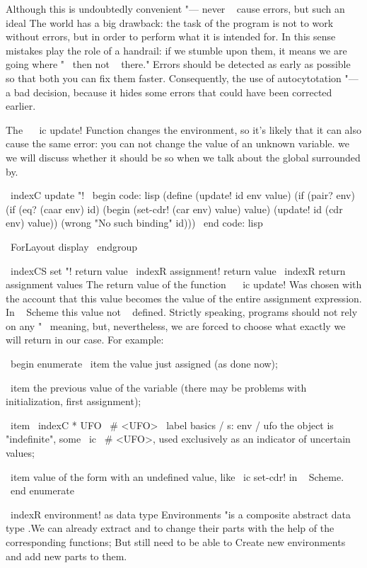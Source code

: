 {Although this is undoubtedly convenient "--- never ~ cause errors, but such an ideal
The world has a big drawback: the task of the program is not to work without
errors, but in order to perform what it is intended for. In this sense
mistakes play the role of a handrail: if we stumble upon them, it means we are going
where "~ then not ~ there." Errors should be detected as early as possible so that both
you can fix them faster. Consequently, the use of autocytotation "---
a bad decision, because it hides some errors that could have been
corrected earlier.

The ~ \ ic {update!} Function changes the environment, so it's likely that it can also
cause the same error: you can not change the value of an unknown variable. we
we will discuss whether it should be so when we talk about the global
surrounded by.

\ indexC {update "!}
\ begin {code: lisp}
(define (update! id env value)
  (if (pair? env)
      (if (eq? (caar env) id)
          (begin (set-cdr! (car env) value)
                 value)
          (update! id (cdr env) value))
      (wrong "No such binding" id)))
\ end {code: lisp}

\ ForLayout {display} { \ endgroup }

\ indexCS {set "!} {return value}
\ indexR {assignment! return value}
\ indexR {return assignment values}
The return value of the function ~ \ ic {update!} Was chosen with the account that this
value becomes the value of the entire assignment expression. In ~ Scheme this value
not ~ defined. Strictly speaking, programs should not rely on any "~
meaning, but, nevertheless, we are forced to choose what exactly we will return
in our case. For example:

\ begin {enumerate}
  \ item the value just assigned (as done now);

  \ item the previous value of the variable (there may be problems
        with initialization, first assignment);

  \ item  \ indexC * {UFO} { \ # <UFO>} \ label {basics / s: env / ufo}
        the object is "indefinite", some \ ic { \ # <UFO>},
        used exclusively as an indicator of uncertain
        values;

  \ item value of the form with an undefined value, like
        \ ic {set-cdr!} in ~ Scheme.
\ end {enumerate}

\ indexR {environment! as data type}
Environments "is a composite abstract data type .We can already extract and
to change their parts with the help of the corresponding functions; But still need to be able to
Create new environments and add new parts to them.

}
